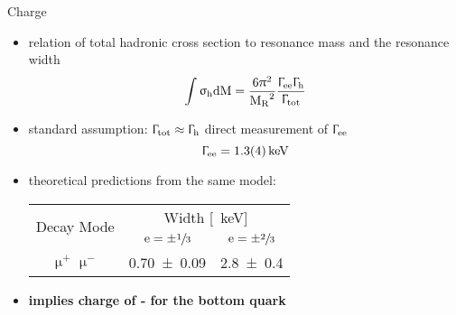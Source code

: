 \begin{frame}{Charge}
	
	\begin{itemize}\itemfill
		\item relation of total hadronic cross section to resonance mass and the resonance width
		\begin{equation*} \int\upsigma_{\z{h}}\z{dM} = \frac{6\uppi^{2}}{{\z{M}_{\z{R}}}^{2}}\frac{\Upgamma_{\z{ee}}\Upgamma_{\z{h}}}{\Upgamma_{\z{tot}}} \end{equation*}
		\item standard assumption: $\Upgamma_{\z{tot}}\approx\Upgamma_{\z{h}}$ \ra direct measurement of $\Upgamma_{\z{ee}}$
		{\begin{equation*} \Upgamma_{\z{ee}} = \SI{1.3\pm.4}{\kilo\electronvolt} \end{equation*}}\vspace*{-20pt}
		\item theoretical predictions from the same model:
		\begin{center}
			\begin{tabular}{c|c|c}
						\multirow{2}{*}{Decay Mode}	& \multicolumn{2}{c}{Width [\SI{}{\kilo\electronvolt}]}\\\cline{2-3}
													& $\z{e} = \pm\sfrac{1}{3}$	& $\z{e} = \pm\sfrac{2}{3}$\\\hline
						$\upmu^{+}\upmu^{-}$ 		& \SI{.70\pm.09}{} 	& \SI{2.8\pm.4}{}
			\end{tabular}		             
		\end{center}\vspace*{10pt}
		\item {}\textbf{implies charge of - for the bottom quark}

	\end{itemize}

	
\end{frame}